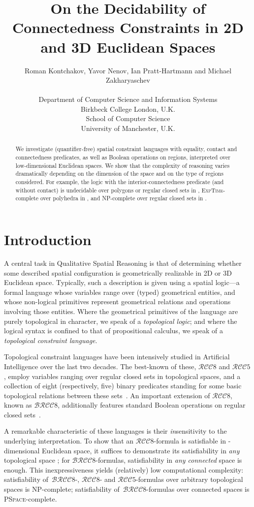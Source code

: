 \documentclass{article}
\title{On the Decidability of Connectedness Constraints in 2D and 3D Euclidean Spaces}
\author{Roman Kontchakov\!, Yavor Nenov\!, Ian Pratt-Hartmann and Michael Zakharyaschev\\
{\parbox[t]{60mm}{\centering Department of Computer Science and Information Systems\\ Birkbeck College London, U.K.}}\hspace*{3em}
\parbox[t]{60mm}{\centering School of Computer Science\\ University of Manchester, U.K.}}
\newcommand{\NP}{\textsc{NP}}
\newcommand{\PSpace}{\textsc{PSpace}}
\newcommand{\ExpTime}{\textsc{ExpTime}}
\newcommand{\RCCE}{\ensuremath{\mathcal{RCC}8}}\newcommand{\RCCF}{\ensuremath{\mathcal{RCC}5}}\newcommand{\BRCCE}{\ensuremath{\mathcal{BRCC}8}}\newcommand{\RCCEc}{\ensuremath{\RCCE{}c}}\newcommand{\RCCEci}{\ensuremath{\RCCE{}c^\circ}}\newcommand{\cBCc}{\ensuremath{\mathcal{C}c}}\newcommand{\cBCci}{\ensuremath{\mathcal{C}c^\circ}}
\begin{document}
\maketitle

\begin{abstract}
We investigate (quantifier-free) spatial constraint languages with
equality, contact and connectedness predicates, as well as Boolean
operations on regions, interpreted over low-dimensional Euclidean
spaces. We show that the complexity of reasoning varies dramatically
depending on the dimension of the space and on the type of regions
considered. For example, the logic with the interior-connectedness
predicate (and without contact) is undecidable over polygons or
regular closed sets in , \ExpTime-complete over polyhedra in
, and \NP-complete over regular closed sets in .
\end{abstract}




\section{Introduction}\label{sec:intro}

A central task in Qualitative Spatial Reasoning is that of determining
whether some described spatial configuration is geometrically
realizable in 2D or 3D Euclidean space. Typically, such a description
is given using a spatial logic---a formal language whose variables
range over (typed) geometrical entities, and whose non-logical
primitives represent geometrical relations and operations involving
those entities. Where the geometrical primitives of the language are
purely topological in character, we speak of a \emph{topological
  logic}; and where the logical syntax is confined to that of
propositional calculus, we speak of a \emph{topological constraint
  language}.

Topological constraint languages have been intensively studied in
Artificial Intelligence over the last two decades.  The best-known of
these, \RCCE{} and \RCCF, employ variables ranging over regular closed
sets in topological spaces, and a collection of eight (respectively,
five) binary predicates standing for some basic topological relations
between these
sets~\cite{ijcai:Egenhofer&Franzosa91,ijcai:Randelletal92,ijcai:Bennett94,ijcai:Renz&Nebel98}. An
important extension of \RCCE, known as \BRCCE{}, additionally features
standard Boolean operations on regular closed
sets~\cite{ijcai:Wolter&Z00ecai}.

A remarkable characteristic of these languages is their
\emph{in}sensitivity to the underlying interpretation.  To show that an
\RCCE-formula is satisfiable in -dimensional Euclidean space, it
suffices to demonstrate its satisfiability in {\em any} topological
space \cite{ijcai:Renz98}; for \BRCCE-formulas, satisfiability in
\emph{any connected} space is enough. This inexpressiveness yields
(relatively) low computational complexity: satisfiability
of~\BRCCE-, \RCCE- and \RCCF-formulas over arbitrary topological
spaces is \NP-complete; satisfiability of~\BRCCE{}-formulas over
connected spaces is \PSpace-complete.
\end{document}
